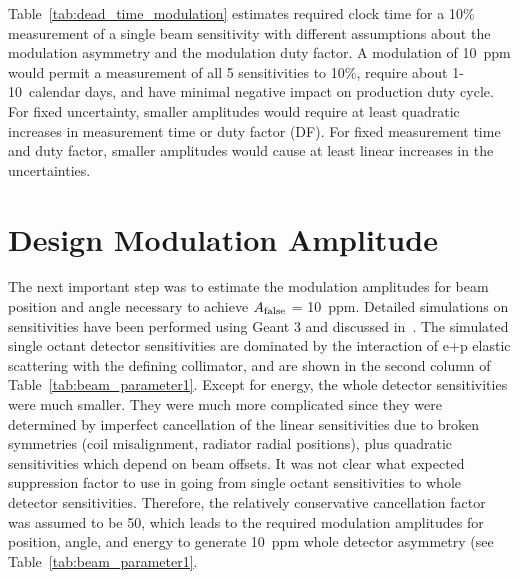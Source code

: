 Table~\ref{tab:dead_time_modulation} estimates required clock time for a 10\% measurement of a single beam sensitivity with different assumptions about the modulation asymmetry and the modulation duty factor. A modulation of 10~ppm would permit a measurement of all 5 sensitivities to 10\%, require about 1-10~calendar days, and have minimal negative impact on production duty cycle. For fixed uncertainty, smaller amplitudes would require at least quadratic increases in measurement time or duty factor (DF). For fixed measurement time and duty factor, smaller amplitudes would cause at least linear increases in the uncertainties. 

\section{Design Modulation Amplitude}
\label{Design Modulation Amplitude}
The next important step was to estimate the modulation amplitudes for beam position and angle necessary to achieve $A_{\rm false}$ = 10~ppm. Detailed simulations on sensitivities have been performed using Geant 3 and discussed in~\cite{jim_sensitivity}. The simulated single octant detector sensitivities are dominated by the interaction of e+p elastic scattering with the defining collimator, and are shown in the second column of Table~\ref{tab:beam_parameter1}.  Except for energy, the whole detector sensitivities were much smaller. They were much more complicated since they were determined by imperfect cancellation of the linear sensitivities due to broken symmetries (coil misalignment, radiator radial positions), plus quadratic sensitivities which depend on beam offsets. It was not clear what expected suppression factor to use in going from single octant sensitivities to whole detector sensitivities. Therefore, the relatively conservative cancellation factor was assumed to be 50, which leads to the required modulation amplitudes for position, angle, and energy to generate 10~ppm whole detector asymmetry (see Table~\ref{tab:beam_parameter1}.

